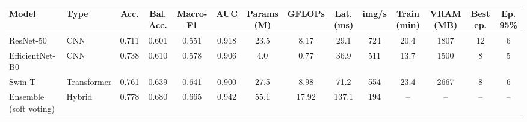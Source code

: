 \begin{tabular}{llcccccccccccc}
\toprule
Model & Type & Acc. & Bal. Acc. & Macro-F1 & AUC & Params (M) & GFLOPs & Lat. (ms) & img/s & Train (min) & VRAM (MB) & Best ep. & Ep. 95\% \\
\midrule
ResNet-50 & CNN & 0.711 & 0.601 & 0.551 & 0.918 & 23.5 & 8.17 & 29.1 & 724 & 20.4 & 1807 & 12 & 6 \\
EfficientNet-B0 & CNN & 0.738 & 0.610 & 0.578 & 0.906 & 4.0 & 0.77 & 36.9 & 511 & 13.7 & 1500 & 8 & 5 \\
Swin-T & Transformer & 0.761 & 0.639 & 0.641 & 0.900 & 27.5 & 8.98 & 71.2 & 554 & 23.4 & 2667 & 8 & 6 \\
Ensemble (soft voting) & Hybrid & 0.778 & 0.680 & 0.665 & 0.942 & 55.1 & 17.92 & 137.1 & 194 & -- & -- & -- & -- \\
\bottomrule
\end{tabular}